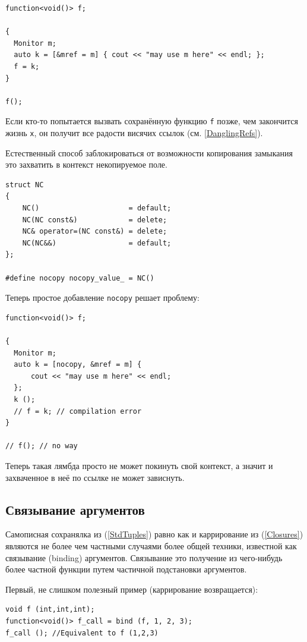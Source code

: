 \documentclass[a4paper,12pt,oneside]{book}
\begin{document}
\begin{lstlisting}
function<void()> f;

{
  Monitor m;
  auto k = [&mref = m] { cout << "may use m here" << endl; };
  f = k;
} 

f();
\end{lstlisting}

Если кто-то попытается вызвать сохранённую функцию \lstinline!f! позже, чем закончится жизнь \lstinline!x!, он получит все радости висячих ссылок (см. \ref{DanglingRefs}).

Естественный способ заблокироваться от возможности копирования замыкания это захватить в контекст некопируемое поле.

\begin{lstlisting}
struct NC
{
    NC()                     = default;
    NC(NC const&)            = delete;
    NC& operator=(NC const&) = delete;
    NC(NC&&)                 = default;
};

#define nocopy nocopy_value_ = NC()
\end{lstlisting}

Теперь простое добавление \lstinline!nocopy! решает проблему:

\begin{lstlisting}
function<void()> f;

{
  Monitor m;
  auto k = [nocopy, &mref = m] { 
      cout << "may use m here" << endl; 
  };
  k ();
  // f = k; // compilation error
}

// f(); // no way
\end{lstlisting}

Теперь такая лямбда просто не может покинуть свой контекст, а значит и захваченное в неё по ссылке не может зависнуть.

\subsection{Связывание аргументов}\label{Binding}

Самописная сохранялка из (\ref{StdTuples}) равно как и каррирование из (\ref{Closures}) являются не более чем частными случаями более общей техники, известной как связывание (binding) аргументов. Связывание это получение из чего-нибудь более частной функции путем частичной подстановки аргументов. 

Первый, не слишком полезный пример (каррирование возвращается):

\begin{lstlisting}
void f (int,int,int);
function<void()> f_call = bind (f, 1, 2, 3);
f_call (); //Equivalent to f (1,2,3)
\end{lstlisting}
\end{document}
